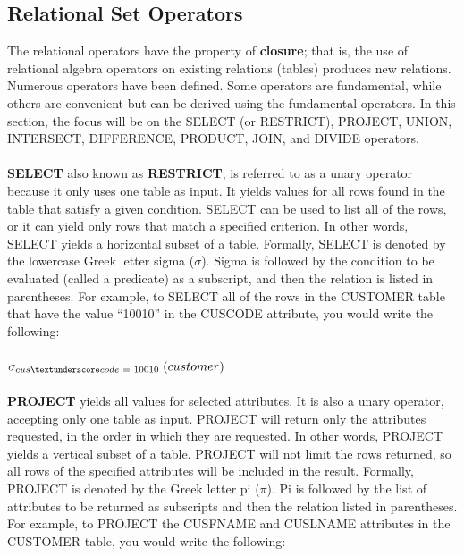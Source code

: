 \documentclass[a4paper, 12pt, titlepage]{report}
\begin{document}
{\subsection{Relational Set Operators}
The relational operators have the property of \textbf{closure}; that is, the use of relational algebra operators on existing relations (tables) produces new relations. Numerous operators have been defined. Some operators are fundamental, while others are convenient but can be derived using the fundamental operators. In this section, the focus will be on the SELECT (or RESTRICT), PROJECT, UNION, INTERSECT, DIFFERENCE, PRODUCT, JOIN, and DIVIDE operators.\\ \\
\textbf{SELECT} also known as \textbf{RESTRICT}, is referred to as a unary operator because it only uses one table as input. It yields values for all rows found in the table that satisfy a given condition. SELECT can be used to list all of the rows, or it can yield only rows that match a specified criterion. In other words, SELECT yields a horizontal subset of a table. Formally, SELECT is denoted by the lowercase Greek letter sigma ($\sigma$). Sigma is followed by the condition to be evaluated (called a predicate) as a subscript, and then the relation is listed in parentheses. For example, to SELECT all of the rows in the CUSTOMER table that have the value “10010” in the CUS\textunderscore CODE attribute, you would write the following:\\ \\
\(\sigma_{cus\textunderscore code\hspace{0.1cm} = \hspace{0.1cm}10010} \hspace{0.1cm}(customer)\) \\ \\
\textbf{PROJECT} yields all values for selected attributes. It is also a unary operator, accepting only one table as input. PROJECT will return only the attributes requested, in the order in which they are requested. In other words, PROJECT yields a vertical
subset of a table. PROJECT will not limit the rows returned, so all rows of the specified attributes will be included in the result. Formally, PROJECT is denoted by the Greek letter pi ($\pi$). Pi is followed by the list of attributes to be returned as subscripts and then the relation listed in parentheses. For example, to PROJECT the CUS\textunderscore FNAME and CUS\textunderscore LNAME attributes in the CUSTOMER table, you would write the following:\\ \\
}
\end{document}
